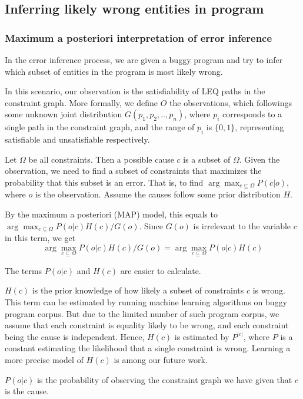 \subsection{Inferring likely wrong entities in program}
\label{sec:mapmodel}

\subsubsection{Maximum a posteriori interpretation of error inference}

In the error inference process, we are given a buggy program and try to infer
which subset of entities in the program is most likely wrong.  

In this scenario, our observation is the satisfiability of LEQ paths in the
constraint graph. More formally, we define $O$ the observations, which
followings some unknown joint distribution $G(p_1, p_2, .., p_n)$, where
$p_i$ corresponds to a single path in the constraint graph, and the range of
$p_i$ is $\{0, 1\}$, representing satisfiable and unsatisfiable respectively.

Let $\Omega$ be all constraints. Then a possible cause $c$ is a subset of
$\Omega$. Given the observation, we need to find a subset of constraints that
maximizes the probability that this subset is an error. That is, to find
$\arg\max_{c \subseteq \Omega} P(c|o)$, where $o$ is the observation.  Assume the
causes follow some prior distribution $H$.

By the maximum a posteriori (MAP) model, this equals to $\arg\max_{c \subseteq
\Omega} P(o|c) H(c) / G(o)$. Since $G(o)$ is irrelevant to the variable $c$ in
this term, we get
\[\arg\max_{c \subseteq \Omega} P(o|c) H(c) / G(o) =  \arg\max_{c
\subseteq \Omega} P(o|c) H(c)\]

The terms $P(o|c)$ and $H(c)$ are easier to calculate.

$H(c)$ is the prior knowledge of how likely a subset of constraints $c$ is
wrong. This term can be estimated by running machine learning algorithms on
buggy program corpus. But due to the limited number of such program corpus, we
assume that each constraint is equality likely to be wrong, and each constraint
being the cause is independent. Hence, $H(c)$ is estimated by $P^{|c|}$, where
$P$ is a constant estimating the likelihood that a single constraint is wrong.
Learning a more precise model of $H(c)$ is among our future work.

$P(o|c)$ is the probability of observing the constraint graph we have given
that $c$ is the cause.

